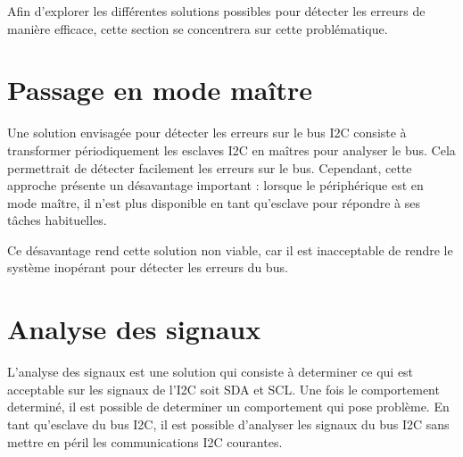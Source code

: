 Afin d'explorer les différentes solutions possibles pour détecter les erreurs de manière efficace, cette section se concentrera sur cette problématique.

\section{Passage en mode maître}

Une solution envisagée pour détecter les erreurs sur le bus I2C consiste à transformer périodiquement les esclaves I2C en maîtres pour analyser le bus.
Cela permettrait de détecter facilement les erreurs sur le bus.
Cependant, cette approche présente un désavantage important : lorsque le périphérique est en mode maître, il n'est plus disponible en tant qu'esclave pour répondre à ses tâches habituelles.

Ce désavantage rend cette solution non viable, car il est inacceptable de rendre le système inopérant pour détecter les erreurs du bus.

\section{Analyse des signaux}

L'analyse des signaux est une solution qui consiste à determiner ce qui est acceptable sur les signaux de l'I2C soit SDA et SCL. Une fois le comportement determiné, il est possible de determiner un comportement qui pose problème. En tant qu'esclave du bus I2C, il est possible d'analyser les signaux du bus I2C sans mettre en péril les communications I2C courantes.